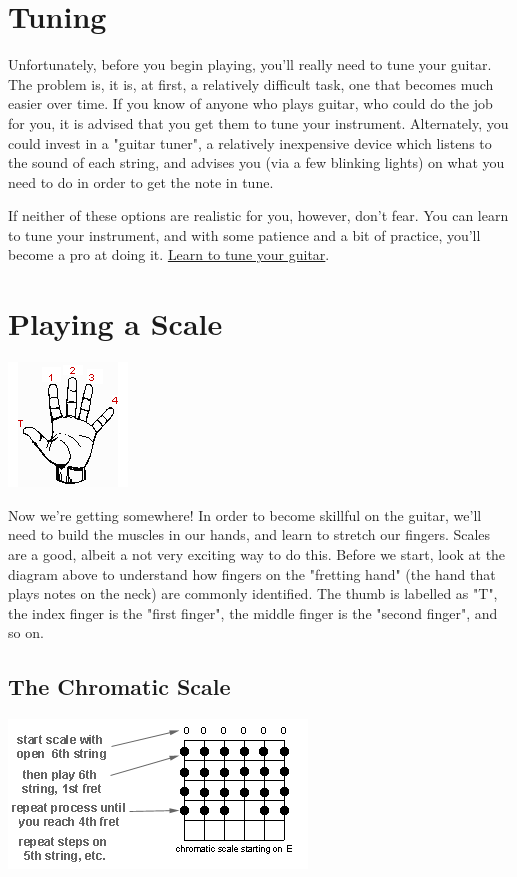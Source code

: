 \section{Tuning}
Unfortunately, before you begin playing, you'll really need to tune your
guitar. The problem is, it is, at first, a relatively difficult task, one that
becomes much easier over time. If you know of anyone who plays guitar, who
could do the job for you, it is advised that you get them to tune your
instrument. Alternately, you could invest in a "guitar tuner", a relatively
inexpensive device which listens to the sound of each string, and advises you
(via a few blinking lights) on what you need to do in order to get the note in
tune.

If neither of these options are realistic for you, however, don't fear. You can
learn to tune your instrument, and with some patience and a bit of practice,
you'll become a pro at doing it.
\href{http://guitar.about.com/od/beginners/ss/how_tune_guitar.htm}{Learn to
tune your guitar}.

\section{Playing a Scale}
\includegraphics{partone/pickinghand.png}

Now we're getting somewhere! In order to become skillful on the guitar, we'll
need to build the muscles in our hands, and learn to stretch our fingers.
Scales are a good, albeit a not very exciting way to do this. Before we start,
look at the diagram above to understand how fingers on the "fretting hand" (the
hand that plays notes on the neck) are commonly identified. The thumb is
labelled as "T", the index finger is the "first finger", the middle finger is
the "second finger", and so on. 

\subsection{The Chromatic Scale}
\includegraphics{partone/chromaticscale.png}

